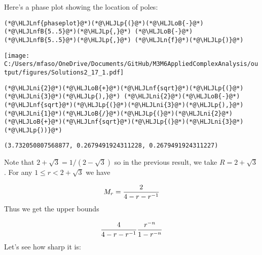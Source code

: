 \documentclass[12pt,a4paper]{article}
\newcommand{\HLJLn}[1]{#1}
\newcommand{\HLJLnf}[1]{\textcolor[RGB]{66,102,213}{#1}}
\newcommand{\HLJLnfB}[1]{\textcolor[RGB]{59,151,46}{#1}}
\newcommand{\HLJLni}[1]{\textcolor[RGB]{59,151,46}{#1}}
\newcommand{\HLJLoB}[1]{\textcolor[RGB]{102,102,102}{\textbf{#1}}}
\newcommand{\HLJLp}[1]{#1}
\begin{document}
Here's a phase plot showing the location of poles:


\begin{lstlisting}
(*@\HLJLnf{phaseplot}@*)(*@\HLJLp{(}@*)(*@\HLJLoB{-}@*)(*@\HLJLnfB{5..5}@*)(*@\HLJLp{,}@*) (*@\HLJLoB{-}@*)(*@\HLJLnfB{5..5}@*)(*@\HLJLp{,}@*) (*@\HLJLn{f}@*)(*@\HLJLp{)}@*)
\end{lstlisting}

\texttt{[image: C:/Users/mfaso/OneDrive/Documents/GitHub/M3M6AppliedComplexAnalysis/output/figures/Solutions2\_17\_1.pdf]}

\begin{lstlisting}
(*@\HLJLni{2}@*)(*@\HLJLoB{+}@*)(*@\HLJLnf{sqrt}@*)(*@\HLJLp{(}@*)(*@\HLJLni{3}@*)(*@\HLJLp{),}@*) (*@\HLJLni{2}@*)(*@\HLJLoB{-}@*) (*@\HLJLnf{sqrt}@*)(*@\HLJLp{(}@*)(*@\HLJLni{3}@*)(*@\HLJLp{),}@*) (*@\HLJLni{1}@*)(*@\HLJLoB{/}@*)(*@\HLJLp{(}@*)(*@\HLJLni{2}@*)(*@\HLJLoB{+}@*)(*@\HLJLnf{sqrt}@*)(*@\HLJLp{(}@*)(*@\HLJLni{3}@*)(*@\HLJLp{))}@*)
\end{lstlisting}

\begin{lstlisting}
(3.732050807568877, 0.2679491924311228, 0.2679491924311227)
\end{lstlisting}


Note that $2+\sqrt 3 = 1/(2-\sqrt 3)$ so in the previous result, we take $R = 2+\sqrt 3$. For any $1 \leq r < 2+\sqrt 3$ we have

\[
M_r = {2 \over 4 - r - r^{-1}}
\]
Thus we get the upper bounds

\[
    {4 \over 4 - r - r^{-1}} {r^{-n} \over 1 - r^{-n}}
\]
Let's see how sharp it is:
\end{document}
